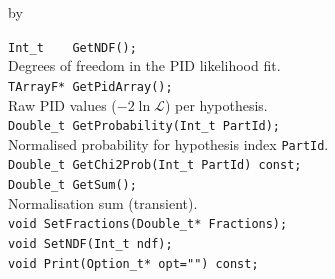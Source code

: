 \documentclass[twoside]{article}
\newcommand{\entrylabel}[1]{\mbox{\textbf{{#1}}}\hfil}%
\newenvironment{entry}
{\begin{list}{}%
    {\renewcommand{\makelabel}{\entrylabel}%
     \setlength{\labelwidth}{90pt}%
     \setlength{\leftmargin}{\labelwidth}
     \advance\leftmargin by \labelsep%
      }%
    }%
  {\end{list}}
\newcommand{\Entrylabel}[1]%
{\raisebox{0pt}[1ex][0pt]{\makebox[\labelwidth][l]%
    {\parbox[t]{\labelwidth}{\hspace{0pt}\textbf{{#1}}}}}}
\newenvironment{Entry}%
{\renewcommand{\entrylabel}{\Entrylabel}\begin{entry}}%
  {\end{entry}}
\begin{document}
\begin{Entry}
\item[Public Member\\ Functions]
    \verb+Int_t    GetNDF();+\\
        Degrees of freedom in the PID likelihood fit.\\
    \verb+TArrayF* GetPidArray();+\\
        Raw PID values ($-2\ln\mathcal{L}$) per hypothesis.\\
    \verb+Double_t GetProbability(Int_t PartId);+\\
        Normalised probability for hypothesis index \verb+PartId+.\\
    \verb+Double_t GetChi2Prob(Int_t PartId) const;+\\
    \verb+Double_t GetSum();+\\
        Normalisation sum (transient).\\
    \verb+void SetFractions(Double_t* Fractions);+\\
    \verb+void SetNDF(Int_t ndf);+\\
    \verb+void Print(Option_t* opt="") const;+\\
\end{Entry}
\clearpage

\end{document}
